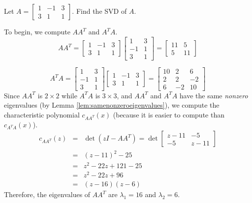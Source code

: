 \documentclass{ximera}
\begin{document}
\begin{example}\label{ex:SVD2x3}
Let
$A=\left[\begin{array}{rrr} 1 & -1 & 3 \\ 3 & 1 & 1 \end{array}\right]$.
Find the SVD of $A$.
 
\begin{explanation}
To begin, we compute $AA^T$ and $A^TA$.
\[ AA^T = \left[\begin{array}{rrr} 1 & -1 & 3 \\ 3 & 1 & 1 \end{array}\right]
\left[\begin{array}{rr} 1 & 3 \\ -1 & 1 \\ 3 & 1  \end{array}\right]
= \left[\begin{array}{rr} 11 & 5 \\ 5 & 11  \end{array}\right]\]
 
\[ A^TA = \left[\begin{array}{rr} 1 & 3 \\ -1 & 1 \\ 3 & 1  \end{array}\right]
\left[\begin{array}{rrr} 1 & -1 & 3 \\ 3 & 1 & 1 \end{array}\right]
= \left[\begin{array}{rrr} 10 & 2 & 6 \\ 2 & 2 & -2\\
6 & -2 & 10 \end{array}\right]\]
Since $AA^T$ is $2\times 2$ while $A^T A$ is $3\times 3$, and $AA^T$
and $A^TA$ have the same {\em nonzero} eigenvalues (by Lemma
\ref{lem:samenonzeroeigenvalues}), we compute the characteristic polynomial  $c_{AA^T}(x)$ (because it is
easier to compute than $c_{A^TA}(x)$).
\begin{eqnarray*}
c_{AA^T}(z)& = &\det(zI-AA^T)=  \det \left[\begin{array}{cc}
z-11 & -5 \\ -5 & z-11 \end{array}\right]\\
& = &(z-11)^2 - 25 \\
& = & z^2-22z+121-25\\
& = & z^2-22z+96\\
& = & (z-16)(z-6)
\end{eqnarray*}
Therefore, the eigenvalues of $AA^T$ are $\lambda_1=16$ and $\lambda_2=6$.
 

\end{explanation}
\end{example}
\end{document}
